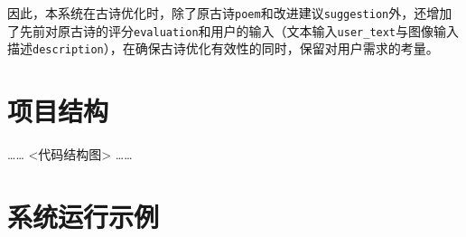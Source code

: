 因此，本系统在古诗优化时，除了原古诗\verb|poem|和改进建议\verb|suggestion|外，还增加了先前对原古诗的评分\verb|evaluation|和用户的输入（文本输入\verb|user_text|与图像输入描述\verb|description|），在确保古诗优化有效性的同时，保留对用户需求的考量。

\section{项目结构}

……
<代码结构图>
……

\section{系统运行示例}